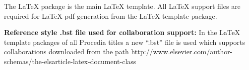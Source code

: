 \documentclass[5p,times,procedia]{elsarticle}
\begin{document}
The LaTeX package is the main LaTeX template. All LaTeX support files are required for LaTeX pdf generation from the LaTeX template package. 

{\bf Reference style .bst file used for collaboration support:} In the LaTeX template packages of all Procedia titles a new ``.bst'' file is used which supports collaborations downloaded from the path http://www.elsevier.com/author-schemas/the-elsarticle-latex-document-class
\end{document}

